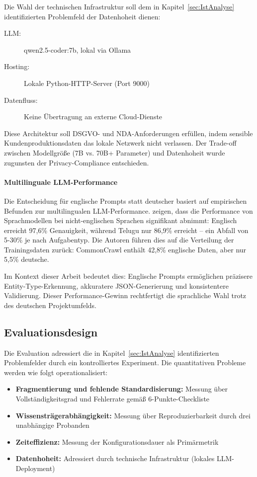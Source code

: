 Die Wahl der technischen Infrastruktur soll dem in Kapitel~\ref{sec:IstAnalyse} identifizierten Problemfeld der Datenhoheit dienen:

\begin{description}
    \item[LLM:] qwen2.5-coder:7b, lokal via Ollama
    \item[Hosting:] Lokale Python-HTTP-Server (Port 9000)
    \item[Datenfluss:] Keine Übertragung an externe Cloud-Dienste
\end{description}

Diese Architektur soll DSGVO- und NDA-Anforderungen erfüllen, indem sensible Kundenproduktionsdaten das lokale Netzwerk nicht verlassen. Der Trade-off zwischen Modellgröße (7B vs. 70B+ Parameter) und Datenhoheit wurde zugunsten der Privacy-Compliance entschieden.

\paragraph{Multilinguale LLM-Performance}

Die Entscheidung für englische Prompts statt deutscher basiert auf empirischen Befunden zur multilingualen LLM-Performance. \cite{gupta:multilingual2025} zeigen, dass die Performance von Sprachmodellen bei nicht-englischen Sprachen signifikant abnimmt: Englisch erreicht 97,6\% Genauigkeit, während Telugu nur 86,9\% erreicht -- ein Abfall von 5-30\% je nach Aufgabentyp. Die Autoren führen dies auf die Verteilung der Trainingsdaten zurück: CommonCrawl enthält 42,8\% englische Daten, aber nur 5,5\% deutsche.

Im Kontext dieser Arbeit bedeutet dies: Englische Prompts ermöglichen präzisere Entity-Type-Erkennung, akkuratere JSON-Generierung und konsistentere Validierung. Dieser Performance-Gewinn rechtfertigt die sprachliche Wahl trotz des deutschen Projektumfelds.


\subsection{Evaluationsdesign}
\label{subsec:Evaluationsdesign}

Die Evaluation adressiert die in Kapitel~\ref{sec:IstAnalyse} identifizierten Problemfelder durch ein kontrolliertes Experiment. Die quantitativen Probleme werden wie folgt operationalisiert:

\begin{itemize}
    \item \textbf{Fragmentierung und fehlende Standardisierung:} Messung über Vollständigkeitsgrad und Fehlerrate gemäß 6-Punkte-Checkliste
    \item \textbf{Wissensträgerabhängigkeit:} Messung über Reproduzierbarkeit durch drei unabhängige Probanden
    \item \textbf{Zeiteffizienz:} Messung der Konfigurationsdauer als Primärmetrik
    \item \textbf{Datenhoheit:} Adressiert durch technische Infrastruktur (lokales LLM-Deployment)
\end{itemize}

